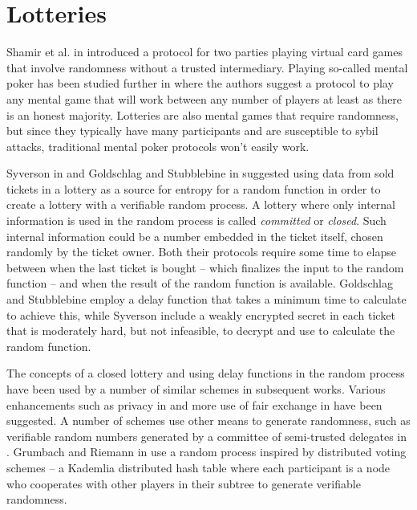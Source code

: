 \section{Lotteries}
\label{sec:lotteries}

Shamir et al. in \cite{shamir_mental_1981} introduced a protocol for two parties playing virtual card games that involve randomness without a trusted intermediary. Playing so-called mental poker has been studied further in \cite{goldreich_how_1987} where the authors suggest a protocol to play any mental game that will work between any number of players at least as there is an honest majority. Lotteries are also mental games that require randomness, but since they typically have many participants and are susceptible to sybil attacks, traditional mental poker protocols won't easily work.

Syverson in \cite{syverson_weakly_1998} and Goldschlag and Stubblebine in \cite{goldschlag_publicly_1998} suggested using data from sold tickets in a lottery as a source for entropy for a random function in order to create a lottery with a verifiable random process. A lottery where only internal information is used in the random process is called \emph{committed} or \emph{closed}. Such internal information could be a number embedded in the ticket itself, chosen randomly by the ticket owner. Both their protocols require some time to elapse between when the last ticket is bought – which finalizes the input to the random function – and when the result of the random function is available. Goldschlag and Stubblebine employ a delay function that takes a minimum time to calculate to achieve this, while Syverson include a weakly encrypted secret in each ticket that is moderately hard, but not infeasible, to decrypt and use to calculate the random function.

The concepts of a closed lottery and using delay functions in the random process have been used by a number of similar schemes in subsequent works. Various enhancements such as privacy in \cite{zhou_playing_2001} and more use of fair exchange in \cite{chow_e-lottery_2005} have been suggested. A number of schemes use other means to generate randomness, such as verifiable random numbers generated by a committee of semi-trusted delegates in \cite{fouque_sharing_2001, lee_design_2009, liu_improved_2014, xia_information_2019}. Grumbach and Riemann in \cite{grumbach_distributed_2017} use a random process inspired by distributed voting schemes – a Kademlia distributed hash table where each participant is a node who cooperates with other players in their subtree to generate verifiable randomness. 

